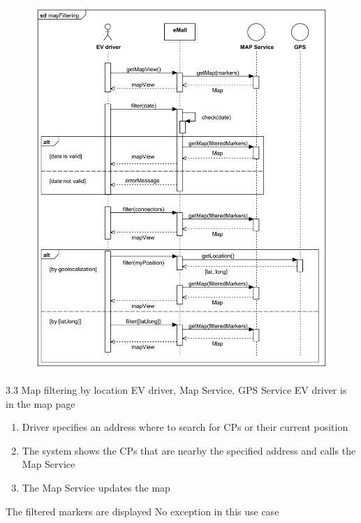 \usecase
{
    \begin{figure}[H]
        \centering
        \includegraphics[scale=0.9]{src/sequence_diagram/mapFiltering.png}
    \end{figure}
}
{3.3}
{Map filtering by location}
{EV driver, Map Service, GPS Service}
{EV driver is in the map page}
{
    \begin{enumerate}
        \item Driver specifies an address where to search for CPs or their current position
        \item The system shows the CPs that are nearby the specified address and calls the Map Service
        \item The Map Service updates the map
    \end{enumerate}
}
{The filtered markers are displayed}
{
    No exception in this use case
}
{
}

